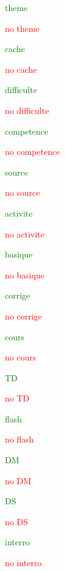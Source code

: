 \documentclass{classe-tex3R-2-1}
\begin{document}


\iftheme \textcolor{green}{theme}\par \else \hfill \textcolor{red}{no} \textcolor{red}{theme}\par \fi
\ifcache \textcolor{green}{cache}\par \else \hfill \textcolor{red}{no} \textcolor{red}{cache}\par \fi
\ifdifficulte \textcolor{green}{difficulte}\par \else \hfill \textcolor{red}{no} \textcolor{red}{difficulte}\par \fi
\ifcompetence \textcolor{green}{competence}\par \else \hfill \textcolor{red}{no} \textcolor{red}{competence}\par \fi
\ifsource \textcolor{green}{source}\par \else \hfill \textcolor{red}{no} \textcolor{red}{source}\par \fi


\bigskip

\ifactivite \textcolor{green}{activite}\par \else \hfill \textcolor{red}{no} \textcolor{red}{activite}\par \fi
\ifbasique \textcolor{green}{basique}\par \else \hfill \textcolor{red}{no} \textcolor{red}{basique}\par \fi
\ifcorrige \textcolor{green}{corrige}\par \else \hfill \textcolor{red}{no} \textcolor{red}{corrige}\par \fi
\ifcours \textcolor{green}{cours}\par \else \hfill \textcolor{red}{no} \textcolor{red}{cours}\par \fi
\ifTD \textcolor{green}{TD}\par \else \hfill \textcolor{red}{no} \textcolor{red}{TD}\par \fi
\ifflash \textcolor{green}{flash}\par \else \hfill \textcolor{red}{no} \textcolor{red}{flash}\par \fi
\ifDM \textcolor{green}{DM}\par \else \hfill \textcolor{red}{no} \textcolor{red}{DM}\par \fi
\ifDS \textcolor{green}{DS}\par \else \hfill \textcolor{red}{no} \textcolor{red}{DS}\par \fi
\ifinterro \textcolor{green}{interro}\par \else \hfill \textcolor{red}{no} \textcolor{red}{interro}\par \fi
\end{document}
